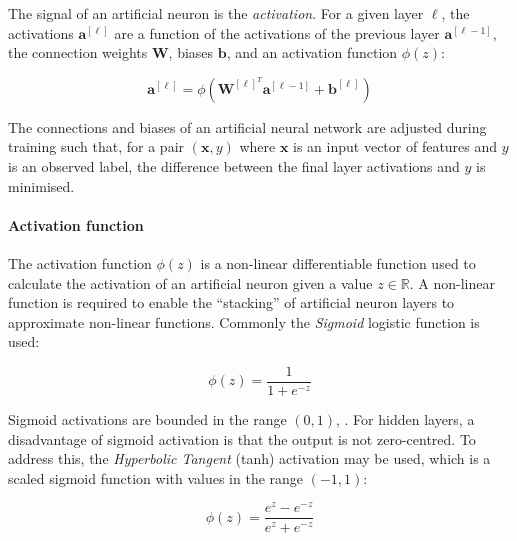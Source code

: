 The signal of an artificial neuron is the \emph{activation}. For a given layer $\ell$, the activations $\bm{a}^{[\ell]}$ are a function of the activations of the previous layer $\bm{a}^{[\ell - 1]}$, the connection weights $\bm{W}$, biases $\bm{b}$, and an activation function $\phi(z)$:

\begin{equation}
  \bm{a}^{[\ell]} = \phi \left( \bm{W}^{[\ell]^T} \bm{a}^{[\ell-1]} + \bm{b}^{[\ell]} \right)
\end{equation}

The connections and biases of an artificial neural network are adjusted during training such that, for a pair $(\bm{x}, y)$ where $\bm{x}$ is an input vector of features and $y$ is an observed label, the difference between the final layer activations and $y$ is minimised.


\paragraph*{Activation function}

The activation function $\phi(z)$ is a non-linear differentiable function used to calculate the activation of an artificial neuron given a value $z \in \mathbb{R}$. A non-linear function is required to enable the ``stacking'' of artificial neuron layers to approximate non-linear functions. Commonly the \emph{Sigmoid} logistic function is used:

\begin{equation}
  \phi(z) = \frac{1}{1 + e^{-z}}
\end{equation}

Sigmoid activations are bounded in the range $(0,1)$, .
For hidden layers, a disadvantage of sigmoid activation is that the output is not zero-centred. To address this, the \emph{Hyperbolic Tangent} (tanh) activation may be used, which is a scaled sigmoid function with values in the range $(-1,1)$:

\begin{equation}
  \phi(z) = \frac{e^{z} - e^{-z}}{e^z + e^{-z}}
\end{equation}

